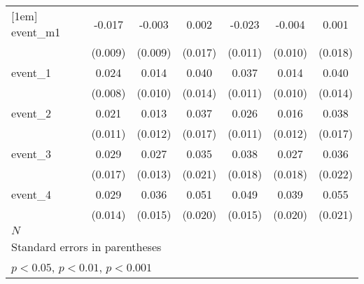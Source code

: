 {\begin{tabular}{l*{6}{c}}
[1em]
event\_m1    &      -0.017         &      -0.003         &       0.002         &      -0.023\sym{*}  &      -0.004         &       0.001         \\
            &     (0.009)         &     (0.009)         &     (0.017)         &     (0.011)         &     (0.010)         &     (0.018)         \\
[1em]
event\_1     &       0.024\sym{**} &       0.014         &       0.040\sym{**} &       0.037\sym{***}&       0.014         &       0.040\sym{**} \\
            &     (0.008)         &     (0.010)         &     (0.014)         &     (0.011)         &     (0.010)         &     (0.014)         \\
[1em]
event\_2     &       0.021         &       0.013         &       0.037\sym{*}  &       0.026\sym{*}  &       0.016         &       0.038\sym{*}  \\
            &     (0.011)         &     (0.012)         &     (0.017)         &     (0.011)         &     (0.012)         &     (0.017)         \\
[1em]
event\_3     &       0.029         &       0.027\sym{*}  &       0.035         &       0.038\sym{*}  &       0.027         &       0.036         \\
            &     (0.017)         &     (0.013)         &     (0.021)         &     (0.018)         &     (0.018)         &     (0.022)         \\
[1em]
event\_4     &       0.029\sym{*}  &       0.036\sym{*}  &       0.051\sym{*}  &       0.049\sym{***}&       0.039         &       0.055\sym{**} \\
            &     (0.014)         &     (0.015)         &     (0.020)         &     (0.015)         &     (0.020)         &     (0.021)         \\
\hline
\(N\)       &                     &                     &                     &                     &                     &                     \\
\hline\hline
\multicolumn{7}{l}{\footnotesize Standard errors in parentheses}\\
\multicolumn{7}{l}{\footnotesize \sym{*} \(p<0.05\), \sym{**} \(p<0.01\), \sym{***} \(p<0.001\)}\\
\end{tabular}
}
